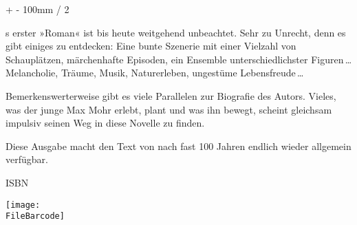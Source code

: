 \documentclass[11pt,twoside,openany,svgnames,x11names]{book}
\begin{document}
\ifdefined\ebook%
\noindent%
%
\fi

\vspace*{0.1cm}

\noindent\hspace*{\dimexpr \TrimmingFB + 15mm + \glueexpr \dimexpr \CoverWidth - 100mm \relax / 2 \relax \relax}\parbox{9cm}{%
\noindent\color{white}\fontsize{20}{22}\libertineLF\textbf{}%
}
\vspace{0.8cm}

\noindent \leftskip \dimexpr \TrimmingFB + \glueexpr \dimexpr \CoverWidth - 100mm \relax / 2 \relax \relax
\begin{minipage}[t]{10cm}
\color{black}\fontsize{14}{16}\biolinumLF\noindent{}%
\buchautor{}s erster »Roman« ist bis heute
weitgehend unbeachtet. Sehr zu Unrecht, denn es gibt einiges zu ent\-decken:
Eine bunte Szenerie mit einer Vielzahl von Schauplätzen, märchenhafte
Epi\-soden, ein Ensemble unterschiedlichster Fi\-gu\-ren\,… Melancholie,
Träume, Musik, Na\-tur\-erleben, ungestüme Lebensfreude\,…

\hspace{1em}Bemerkenswerterweise gibt es viele Parallelen zur Biografie
des Autors.
Vieles, was der junge Max Mohr erlebt, plant und was ihn bewegt, scheint
gleichsam impulsiv seinen Weg in diese Novelle zu finden.

\hspace{1em}Diese Ausgabe macht den Text von \textit{\buchtitel{}}
nach fast 100 Jahren endlich wieder allgemein verfügbar.
\end{minipage}

\vfill

\ifdefined\ebook
\null
\else
\begin{center}
\hspace*{\dimexpr\TrimmingFB\relax}ISBN \ISBN{}

\vspace{0.5cm}

\hspace*{\dimexpr\TrimmingFB\relax}\texttt{[image: \\FileBarcode]}
\end{center}
\fi

\vspace*{\dimexpr\Trimming+5mm\relax}
\end{document}
